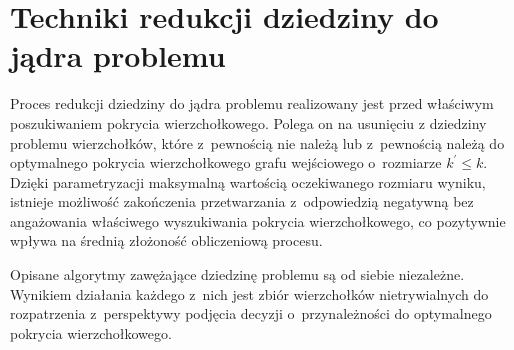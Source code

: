 \section{Techniki redukcji dziedziny do jądra problemu}\label{s_kernelization}

Proces redukcji dziedziny do jądra problemu realizowany jest przed właściwym 
poszukiwaniem pokrycia wierzchołkowego. 
Polega on na usunięciu z dziedziny problemu wierzchołków, które z~pewnością nie 
należą lub z~pewnością należą do optymalnego pokrycia wierzchołkowego grafu 
wejściowego o~rozmiarze $k^\prime \leq k$.
Dzięki parametryzacji maksymalną wartością oczekiwanego rozmiaru wyniku,
istnieje możliwość zakończenia przetwarzania z~odpowiedzią negatywną bez
angażowania właściwego wyszukiwania pokrycia wierzchołkowego, co pozytywnie
wpływa na średnią złożoność obliczeniową procesu.

Opisane algorytmy zawężające dziedzinę problemu są od siebie niezależne.
Wynikiem działania każdego z~nich jest zbiór wierzchołków nietrywialnych do
rozpatrzenia z~perspektywy podjęcia decyzji o~przynależności do optymalnego
pokrycia wierzchołkowego.






